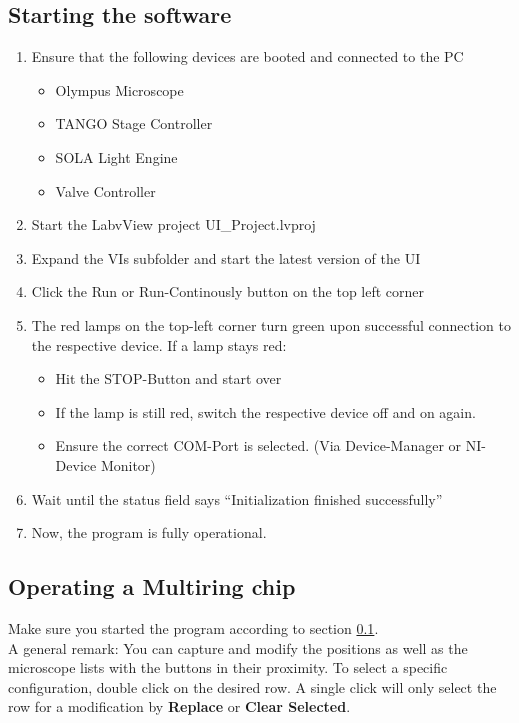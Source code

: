\documentclass{article}
\begin{document}
\subsection{Starting the software}
\label{sec:software_start}
\begin{enumerate}
	\item Ensure that the following devices are booted and connected to the PC
	\begin{itemize}
		\item Olympus Microscope
		\item TANGO Stage Controller
		\item SOLA Light Engine
		\item Valve Controller 
	\end{itemize}
	\item Start the LabvView project UI\_{}Project.lvproj
	\item Expand the VIs subfolder and start the latest version of the UI
	\item Click the Run or Run-Continously button on the top left corner
	\item The red lamps on the top-left corner turn green upon successful connection to the respective device.
	\subitem If a lamp stays red:
	\begin{itemize}
		\item Hit the STOP-Button and start over
		\item If the lamp is still red, switch the respective device off and on again.
		\item Ensure the correct COM-Port is selected. (Via Device-Manager or NI-Device Monitor)
	\end{itemize}

	\item Wait until the status field says ``Initialization finished successfully''
	\item 	Now, the program is fully operational.
\end{enumerate}



\subsection{Operating a Multiring chip}
Make sure you started the program according to section \ref{sec:software_start}.\\
A general remark: You can capture and modify the positions as well as the microscope lists with the buttons in their proximity. To select a specific configuration, double click on the desired row. A single click will only select the row for a modification by \textbf{Replace} or \textbf{Clear Selected}. 
\end{document}

